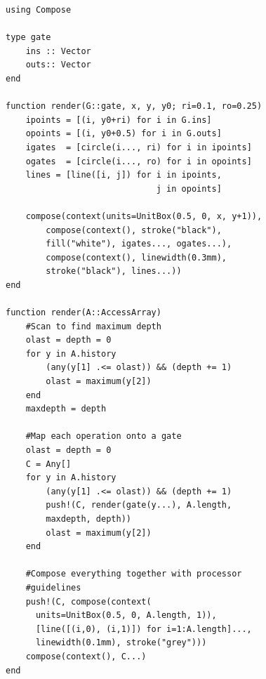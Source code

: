 \documentclass{sig-alternate}
\begin{document}
\begin{verbatim}
using Compose

type gate
    ins :: Vector
    outs:: Vector
end

function render(G::gate, x, y, y0; ri=0.1, ro=0.25)
    ipoints = [(i, y0+ri) for i in G.ins]
    opoints = [(i, y0+0.5) for i in G.outs]
    igates  = [circle(i..., ri) for i in ipoints]
    ogates  = [circle(i..., ro) for i in opoints]
    lines = [line([i, j]) for i in ipoints,
                              j in opoints]

    compose(context(units=UnitBox(0.5, 0, x, y+1)),
        compose(context(), stroke("black"),
	    fill("white"), igates..., ogates...),
        compose(context(), linewidth(0.3mm),
	    stroke("black"), lines...))
end

function render(A::AccessArray)
    #Scan to find maximum depth
    olast = depth = 0
    for y in A.history
        (any(y[1] .<= olast)) && (depth += 1)
        olast = maximum(y[2])
    end
    maxdepth = depth
    
    #Map each operation onto a gate
    olast = depth = 0
    C = Any[]
    for y in A.history
        (any(y[1] .<= olast)) && (depth += 1)
        push!(C, render(gate(y...), A.length,
	    maxdepth, depth))
        olast = maximum(y[2])
    end
    
    #Compose everything together with processor
    #guidelines
    push!(C, compose(context(
      units=UnitBox(0.5, 0, A.length, 1)),
      [line([(i,0), (i,1)]) for i=1:A.length]...,
      linewidth(0.1mm), stroke("grey")))
    compose(context(), C...)
end
\end{verbatim}
\end{document}
